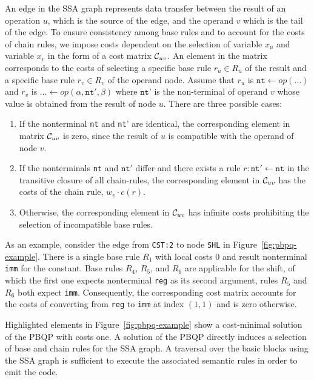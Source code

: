 An edge in the SSA graph represents data transfer between the result
of an operation $u$, which is the source of the edge, and the operand
$v$ which is the tail of the edge.  To ensure consistency among base
rules and to account for the costs of chain rules, we impose costs
dependent on the selection of variable $x_u$ and variable $x_v$ in the
form of a cost matrix $\mathcal C_{uv}$. An element in the matrix
corresponds to the costs of selecting a specific base rule $r_u \in
R_u$ of the result and a specific base rule $r_v \in R_v$ of the
operand node. Assume that $r_u $ is $\texttt{nt} \leftarrow
\textit{op} (\dots)$ and $r_v$ is $\dots \leftarrow \textit{op}
(\alpha, \texttt{nt}', \beta)$ where $\texttt{nt'}$ is the
non-terminal of operand $v$ whose value is obtained from the result of
node $u$. There are three possible cases:
\begin{enumerate}
\item If the nonterminal \texttt{nt} and \texttt{nt}' are identical,
  the corresponding element in matrix $\mathcal C_{uv}$ is zero,
  since the result of $u$ is compatible with the operand of node $v$.
\item If the nonterminals \texttt{nt} and $\texttt{nt}'$ differ and
  there exists a rule $r: \texttt{nt}' \leftarrow \texttt{nt}$ in the
  transitive closure of all chain-rules, the corresponding element in
  $\mathcal C_{uv}$ has the costs of the chain rule, \ie $w_v \cdot
  c(r)$.
\item Otherwise, the corresponding element in $\mathcal C_{uv}$ has
  infinite costs prohibiting the selection of incompatible base rules.
\end{enumerate}

As an example, consider the edge from \texttt{CST:2} to node
\texttt{SHL} in Figure~\ref{fig:pbpq-example}. There is a single base
rule $R_1$ with local costs 0 and result nonterminal \texttt{imm} for
the constant. Base rules $R_4$, $R_5$, and $R_6$ are applicable for
the shift, of which the first one expects nonterminal \texttt{reg} as
its second argument, rules $R_5$ and $R_6$ both expect
\texttt{imm}. Consequently, the corresponding cost matrix accounts for
the costs of converting from \texttt{reg} to \texttt{imm} at index
$(1,1)$ and is zero otherwise.

Highlighted elements in Figure~\ref{fig:pbpq-example} show a
cost-minimal solution of the PBQP with costs one. A solution of the
PBQP directly induces a selection of base and chain rules for the SSA
graph. A traversal over the basic blocks using the SSA graph is
sufficient to execute the associated semantic rules in order to emit
the code.

